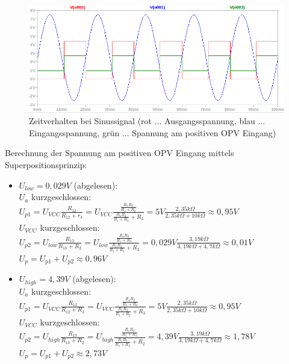 \documentclass[12pt,a4paper,titlepage]{article}
\begin{document}
\begin{figure}[H]
  \centering
  \includegraphics[width=150mm]{schmitt_transient.png}
  \caption{Zeitverhalten bei Sinussignal (rot $\hdots$ Ausgangsspannung, blau $\hdots$ Eingangsspannung, gr\"un $\hdots$ Spannung am positiven OPV Eingang)}
\end{figure}

\noindent Berechnung der Spannung am positiven OPV Eingang mittels Superpositionsprinzip:

\begin{itemize}
  \item $U_{low} = 0,029V$ (abgelesen):\\
  $U_a$ kurzgeschlossen:\\
  $U_{p1} = U_{VCC}\frac{R_{12}}{R_{12}+r_3} = U_{VCC}\frac{\frac{R_1R_2}{R_1+R_2}}{\frac{R_1R_2}{R_1+R_2}+R_3} = 5V\frac{2,35k\Omega}{2,35k\Omega + 10k\Omega} \approx 0,95V$\\
  $U_{VCC}$ kurzgeschlossen:\\
  $U_{p2} = U_{low}\frac{R_{13}}{R_{13}+R_2} = U_{low}\frac{\frac{R_1R_3}{R_1+R_3}}{\frac{R_1R_3}{R_1+R_3}+R_2} = 0,029V\frac{3,19k\Omega}{3,19k\Omega + 4,7k\Omega} \approx 0,01V$\\
  $U_p = U_{p1} + U_{p2} \approx 0,96V$

  \item $U_{high} = 4,39V$ (abgelesen):\\
  $U_a$ kurzgeschlossen:\\
  $U_{p1} = U_{VCC}\frac{R_{12}}{R_{12}+R_3} = U_{VCC}\frac{\frac{R_1R_2}{R_1+R_2}}{\frac{R_1R_2}{R_1+R_2}+R_3} = 5V\frac{2,35k\Omega}{2,35k\Omega + 10k\Omega} \approx 0,95V$\\
  $U_{VCC}$ kurzgeschlossen:\\
  $U_{p2} = U_{high}\frac{R_{13}}{R_{13}+R_2} = U_{high}\frac{\frac{R_1R_3}{R_1+R_3}}{\frac{R_1R_3}{R_1+R_3}+R_2} = 4,39V\frac{3,19k\Omega}{3,19k\Omega + 4,7k\Omega} \approx 1,78V$\\
  $U_p = U_{p1} + U_{p2} \approx 2,73V$
\end{itemize}
\end{document}
